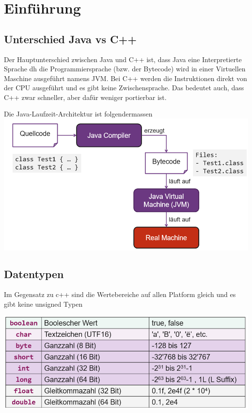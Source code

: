 \section{Einführung}
\subsection{Unterschied Java vs C++}
Der Hauptunterschied zwischen Java und C++ ist, dass Java eine Interpretierte Sprache dh die Programmiersprache (bzw. der Bytecode) wird in einer Virtuellen Maschine ausgeführt namens JVM. 
Bei C++ werden die Instruktionen direkt von der CPU ausgeführt und es gibt keine Zwischensprache. Das bedeutet auch, dass C++ zwar schneller, aber dafür weniger portierbar ist.

Die Java-Laufzeit-Architektur ist folgendermassen\\
\includegraphics[width=\columnwidth]{Images/laufzeit_architektur}

\subsection{Datentypen}
Im Gegensatz zu c++ sind die Wertebereiche auf allen Platform gleich und es gibt keine unsigned Typen
\begin{center}
	\includegraphics[width=\columnwidth,keepaspectratio=true]{Images/datentypen}
\end{center}

